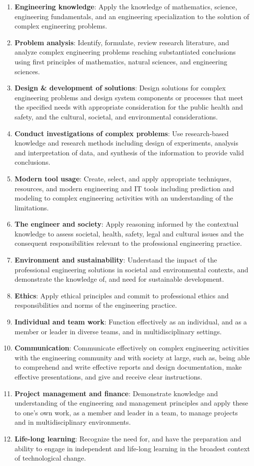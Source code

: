 \documentclass[a4 paper,11pt]{report}
\begin{document}
\begin{enumerate}
\item \textbf{Engineering knowledge}: Apply the knowledge of mathematics, science, engineering fundamentals, and an engineering specialization to the solution of complex engineering problems. 
\item \textbf{Problem analysis}: Identify, formulate, review research literature, and analyze complex engineering problems reaching substantiated conclusions using first principles of mathematics, natural sciences, and engineering sciences. 
\item \textbf{Design \& development of solutions}: Design solutions for complex engineering problems and design system components or processes that meet the specified needs with appropriate consideration for the public health and safety, and the cultural, societal, and environmental considerations. 
\item \textbf{Conduct investigations of complex problems}: Use research-based knowledge and research methods including design of experiments, analysis and interpretation of data, and synthesis of the information to provide valid conclusions. 
\item \textbf{Modern tool usage}: Create, select, and apply appropriate techniques, resources, and modern engineering and IT tools including prediction and modeling to complex engineering activities with an understanding of the limitations. 
\item \textbf{The engineer and society}: Apply reasoning informed by the contextual knowledge to assess societal, health, safety, legal and cultural issues and the consequent responsibilities relevant to the professional engineering practice. 
\item \textbf{Environment and sustainability}: Understand the impact of the professional engineering solutions in societal and environmental contexts, and demonstrate the knowledge of, and need for sustainable development. 
\item \textbf{Ethics}: Apply ethical principles and commit to professional ethics and responsibilities and norms of the engineering practice.
\item \textbf{Individual and team work}: Function effectively as an individual, and as a member or leader in diverse teams, and in multidisciplinary settings. 
\item \textbf{Communication}: Communicate effectively on complex engineering activities with the engineering community and with society at large, such as, being able to comprehend and write effective reports and design documentation, make effective presentations, and give and receive clear instructions. 
\item \textbf{Project management and finance}: Demonstrate knowledge and understanding of the engineering and management principles and apply these to one’s own work, as a member and leader in a team, to manage projects and in multidisciplinary environments. 
\item \textbf{Life-long learning}: Recognize the need for, and have the preparation and ability to engage in independent and life-long learning in the broadest context of technological change.
\end{enumerate}
\end{document}
